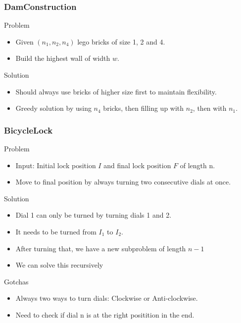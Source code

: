 \documentclass{beamer}
\begin{document}
\begin{frame}
    \frametitle{DamConstruction}
    \begin{block}{Problem}
        \begin{itemize}
            \item Given $(n_1, n_2, n_4)$ lego bricks of size 1, 2 and 4.
            \item Build the highest wall of width $w$.
        \end{itemize}
    \end{block}
    \begin{block}{Solution}
        \begin{itemize}
            \item Should always use bricks of higher size first to maintain flexibility.
            \item Greedy solution by using $n_4$ bricks, then filling up with $n_2$, then with $n_1$.
        \end{itemize}
    \end{block}
\end{frame}

\begin{frame}
    \frametitle{BicycleLock}
    \begin{block}{Problem}
        \begin{itemize}
            \item Input: Initial lock position $I$ and final lock position $F$ of length n.
            \item Move to final position by always turning two consecutive dials at once.
        \end{itemize}
    \end{block}
    \begin{block}{Solution}
        \begin{itemize}
            \item Dial 1 can only be turned by turning dials 1 and 2.
            \item It needs to be turned from $I_1$ to $I_2$.
            \item After turning that, we have a new subproblem of length $n-1$
            \item We can solve this recursively
        \end{itemize}
    \end{block}
    \begin{block}{Gotchas}
        \begin{itemize}
            \item Always two ways to turn dials: Clockwise or Anti-clockwise.
            \item Need to check if dial n is at the right positition in the end.
        \end{itemize}
    \end{block}
\end{frame}
\end{document}
